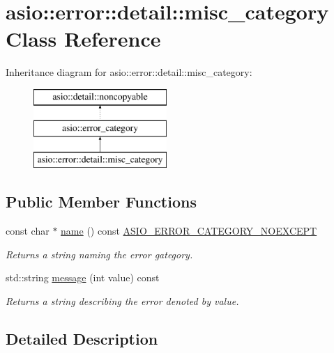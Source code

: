 \hypertarget{classasio_1_1error_1_1detail_1_1misc__category}{}\section{asio\+:\+:error\+:\+:detail\+:\+:misc\+\_\+category Class Reference}
\label{classasio_1_1error_1_1detail_1_1misc__category}
Inheritance diagram for asio\+:\+:error\+:\+:detail\+:\+:misc\+\_\+category\+:\begin{figure}[H]
\begin{center}
\leavevmode
\includegraphics[height=3.000000cm]{classasio_1_1error_1_1detail_1_1misc__category}
\end{center}
\end{figure}
\subsection*{Public Member Functions}
\begin{DoxyCompactItemize}
\item 
const char $\ast$ \hyperlink{classasio_1_1error_1_1detail_1_1misc__category_a37834d191e29609ee6e3ca8276d84925}{name} () const \hyperlink{config_8hpp_a1e51af6137c0e4e4d686921037649e74}{A\+S\+I\+O\+\_\+\+E\+R\+R\+O\+R\+\_\+\+C\+A\+T\+E\+G\+O\+R\+Y\+\_\+\+N\+O\+E\+X\+C\+E\+P\+T}
\begin{DoxyCompactList}\small\item\em Returns a string naming the error gategory. \end{DoxyCompactList}\item 
std\+::string \hyperlink{classasio_1_1error_1_1detail_1_1misc__category_a463a6ad3ff0c9902bb7ffd3d604869ed}{message} (int value) const 
\begin{DoxyCompactList}\small\item\em Returns a string describing the error denoted by {\ttfamily value}. \end{DoxyCompactList}\end{DoxyCompactItemize}


\subsection{Detailed Description}



